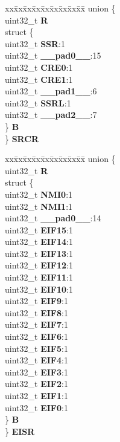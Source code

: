 \begin{DoxyCompactItemize}
\begin{tabbing}
\end{tabbing}\item 
\mbox{\label{structSIU__tag_a599010c55c15b0191171a495e65bc63f}} 
\begin{tabbing}
xx\=xx\=xx\=xx\=xx\=xx\=xx\=xx\=xx\=\kill
union \{\\
\>uint32\_t {\bfseries R}\\
\>struct \{\\
\>\>uint32\_t {\bfseries SSR}:1\\
\>\>uint32\_t {\bfseries \_\_pad0\_\_}:15\\
\>\>uint32\_t {\bfseries CRE0}:1\\
\>\>uint32\_t {\bfseries CRE1}:1\\
\>\>uint32\_t {\bfseries \_\_pad1\_\_}:6\\
\>\>uint32\_t {\bfseries SSRL}:1\\
\>\>uint32\_t {\bfseries \_\_pad2\_\_}:7\\
\>\} {\bfseries B}\\
\} {\bfseries SRCR}\\

\end{tabbing}\item 
\mbox{\label{structSIU__tag_a96b975e26d42d2c093032396319f7c6f}} 
\begin{tabbing}
xx\=xx\=xx\=xx\=xx\=xx\=xx\=xx\=xx\=\kill
union \{\\
\>uint32\_t {\bfseries R}\\
\>struct \{\\
\>\>uint32\_t {\bfseries NMI0}:1\\
\>\>uint32\_t {\bfseries NMI1}:1\\
\>\>uint32\_t {\bfseries \_\_pad0\_\_}:14\\
\>\>uint32\_t {\bfseries EIF15}:1\\
\>\>uint32\_t {\bfseries EIF14}:1\\
\>\>uint32\_t {\bfseries EIF13}:1\\
\>\>uint32\_t {\bfseries EIF12}:1\\
\>\>uint32\_t {\bfseries EIF11}:1\\
\>\>uint32\_t {\bfseries EIF10}:1\\
\>\>uint32\_t {\bfseries EIF9}:1\\
\>\>uint32\_t {\bfseries EIF8}:1\\
\>\>uint32\_t {\bfseries EIF7}:1\\
\>\>uint32\_t {\bfseries EIF6}:1\\
\>\>uint32\_t {\bfseries EIF5}:1\\
\>\>uint32\_t {\bfseries EIF4}:1\\
\>\>uint32\_t {\bfseries EIF3}:1\\
\>\>uint32\_t {\bfseries EIF2}:1\\
\>\>uint32\_t {\bfseries EIF1}:1\\
\>\>uint32\_t {\bfseries EIF0}:1\\
\>\} {\bfseries B}\\
\} {\bfseries EISR}\\


\end{tabbing}
\end{DoxyCompactItemize}
